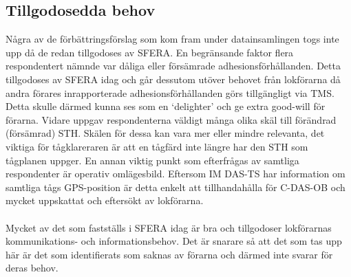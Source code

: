 \subsection{Tillgodosedda behov}
Några av de förbättringsförslag som kom fram under datainsamlingen togs inte upp då de redan tillgodoses av SFERA\@.
En begränsande faktor flera respondentert nämnde var dåliga eller försämrade adhesionsförhållanden.
Detta tillgodoses av SFERA idag och går dessutom utöver behovet från lokförarna då andra förares inrapporterade adhesionsförhållanden görs tillgängligt via TMS\@.
Detta skulle därmed kunna ses som en \lq{}delighter\rq{} och ge extra good-will för förarna.
Vidare uppgav respondenterna väldigt många olika skäl till förändrad (försämrad) STH\@.
Skälen för dessa kan vara mer eller mindre relevanta, det viktiga för tågklareraren är att en tågfärd inte längre har den STH som tågplanen uppger.
En annan viktig punkt som efterfrågas av samtliga respondenter är operativ omlägesbild.
Eftersom IM DAS-TS har information om samtliga tågs GPS-position är detta enkelt att tillhandahålla för C-DAS-OB och mycket uppskattat och eftersökt av lokförarna.
\paragraph{}
Mycket av det som fastställs i SFERA idag är bra och tillgodoser lokförarnas kommunikations- och informationsbehov.
Det är snarare så att det som tas upp här är det som identifierats som saknas av förarna och därmed inte svarar för deras behov.
